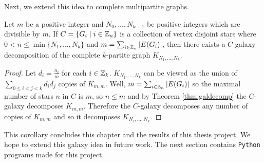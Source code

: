 Next, we extend this idea to complete multipartite graphs.
\begin{corollary}
Let $m$ be a positive integer and $N_{0},\hdots,N_{k-1}$ be positive integers which are divisible by $m$. If $C=\{G_{i}\mid i\in \mathbb{Z}_{n}\}$ is a collection of vertex disjoint stars where $0<n\leq \min\{N_{1},\hdots,N_{k}\}$ and $m=\sum_{i\in \mathbb{Z}_{n}} |E(G_{i})|$, then there exists a $C$-galaxy decomposition of the complete $k$-partite graph $K_{N_{1},\hdots,N_{k}}$.
\end{corollary}
\begin{proof}
Let $d_{i}=\frac{n_{i}}{m}$ for each $i\in \mathbb{Z}_{k}$. $K_{N_{1},\hdots,N_{k}}$ can be viewed as the union of $\sum\limits_{0\leq i<j<k} d_{i}d_{j}$ copies of $K_{m,m}$. Well, $m=\sum_{i\in \mathbb{Z}_{n}} |E(G_{i})|$ so the maximal number of stars $n$ in $C$ is $m$, so $n\leq m$ and by Theorem \ref{thm:galdecomp} the $C$-galaxy decomposes $K_{m,m}$. Therefore the $C$-galaxy decomposes any number of copies of $K_{m,m}$ and so it decomposes $K_{N_{1},\hdots,N_{k}}$.

\end{proof}
This corollary concludes this chapter and the results of this thesis project. We hope to extend this galaxy idea in future work. The next section contains \verb|Python| programs made for this project.